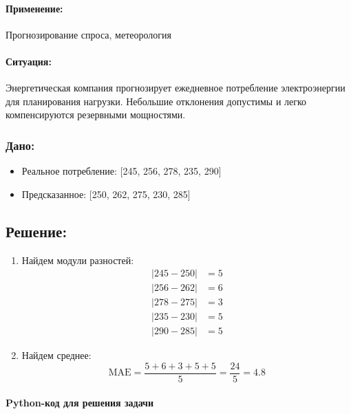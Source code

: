 \paragraph{Применение:} Прогнозирование спроса, метеорология

\paragraph{Ситуация:} Энергетическая компания прогнозирует ежедневное потребление электроэнергии для планирования нагрузки. Небольшие отклонения допустимы и легко компенсируются резервными мощностями.

\subsubsection*{Дано:}
\begin{itemize}
    \item Реальное потребление: [245, 256, 278, 235, 290]
    \item Предсказанное: [250, 262, 275, 230, 285]
\end{itemize}

\subsection*{Решение:}

\begin{enumerate}
    \item {Найдем модули разностей:}
    \[
    \begin{aligned}
    |245 - 250| &= 5 \\
    |256 - 262| &= 6 \\
    |278 - 275| &= 3 \\
    |235 - 230| &= 5 \\
    |290 - 285| &= 5
    \end{aligned}
    \]

    \item {Найдем среднее:}
    \[
    \text{MAE} = \frac{5 + 6 + 3 + 5 + 5}{5} = \frac{24}{5} = 4.8
    \]
\end{enumerate}

\paragraph*{Python-код для решения задачи}

